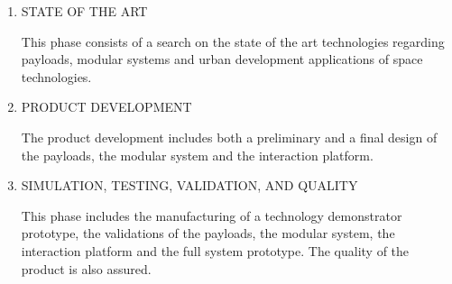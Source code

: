 \begin{enumerate}[label*=\arabic*.]
	\item STATE OF THE ART

This phase consists of a search on the state of the art technologies regarding payloads, modular systems and urban development applications of space technologies.
	
	\item PRODUCT DEVELOPMENT

The product development includes both a preliminary and a final design of the payloads, the modular system and the interaction platform. 
	
	\item SIMULATION, TESTING, VALIDATION, AND QUALITY

This phase includes the manufacturing of a technology demonstrator prototype, the validations of the payloads, the modular system, the interaction platform and the full system prototype. The quality of the product is also assured. 
	
\end{enumerate}
